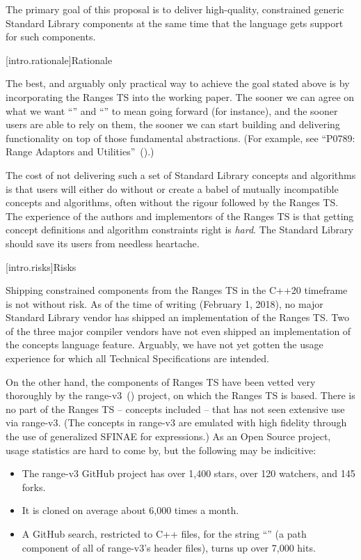 \pnum
The primary goal of this proposal is to deliver high-quality, constrained generic
Standard Library components at the same time that the language gets support for
such components.

[intro.rationale]{Rationale}

\pnum
The best, and arguably only practical way to achieve the goal stated above is by
incorporating the Ranges TS into the working paper. The sooner we can agree on
what we want ``'' and ``'' to mean going forward
(for instance), and the sooner users are able to rely on them, the sooner we can
start building and delivering functionality on top of those fundamental
abstractions. (For example, see ``P0789: Range Adaptors and
Utilities''~(\cite{P0789}).)

\pnum
The cost of not delivering such a set of Standard Library concepts
and algorithms is that users will either do without or create a babel of mutually
incompatible concepts and algorithms, often without the rigour followed by the
Ranges TS. The experience of the authors and implementors of the Ranges TS is that
getting concept definitions and algorithm constraints right is \textit{hard}. The
Standard Library should save its users from needless heartache.

[intro.risks]{Risks}

\pnum
Shipping constrained components from the Ranges TS in the C++20 timeframe is not
without risk. As of the time of writing (February 1, 2018), no major Standard
Library vendor has shipped an implementation of the Ranges TS. Two of the three
major compiler vendors have not even shipped an implementation of the concepts
language feature. Arguably, we have not yet gotten the usage experience for which
all Technical Specifications are intended.

\pnum
On the other hand, the components of Ranges TS have been vetted very thoroughly
by the range-v3~(\cite{range-v3}) project, on which the Ranges TS is based. There is
no part of the Ranges TS -- concepts included -- that has not seen extensive use
via range-v3. (The concepts in range-v3 are emulated with high fidelity through
the use of generalized SFINAE for expressions.) As an Open Source project, usage
statistics are hard to come by, but the following may be indicitive:

\begin{itemize}
\item The range-v3 GitHub project has over 1,400 stars, over 120 watchers, and
145 forks.
\item It is cloned on average about 6,000 times a month.
\item A GitHub search, restricted to C++ files, for the string
``'' (a path component of all of range-v3's header files), turns
up over 7,000 hits.
\end{itemize}

